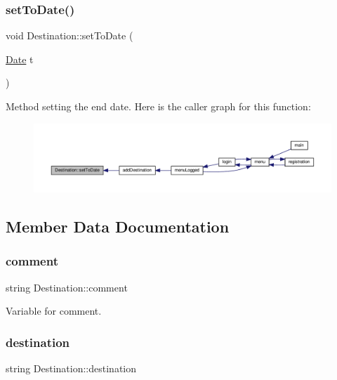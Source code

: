 \subsubsection{\texorpdfstring{set\+To\+Date()}{setToDate()}}
{\footnotesize\ttfamily void Destination\+::set\+To\+Date (\begin{DoxyParamCaption}\item[{\hyperlink{class_date}{Date}}]{t }\end{DoxyParamCaption})}

Method setting the end date. Here is the caller graph for this function\+:\nopagebreak
\begin{figure}[H]
\begin{center}
\leavevmode
\includegraphics[width=350pt]{class_destination_afec038764d48882a9005cea50e418219_icgraph}
\end{center}
\end{figure}


\subsection{Member Data Documentation}
\mbox{\label{class_destination_a4788b97b93c5336a8717540e0daa841a}} 
\subsubsection{\texorpdfstring{comment}{comment}}
{\footnotesize\ttfamily string Destination\+::comment\hspace{0.3cm}{\ttfamily [private]}}

Variable for comment. \mbox{\label{class_destination_ad5bc042020c7faf68d8940061142a0ea}} 
\subsubsection{\texorpdfstring{destination}{destination}}
{\footnotesize\ttfamily string Destination\+::destination\hspace{0.3cm}{\ttfamily [private]}}

